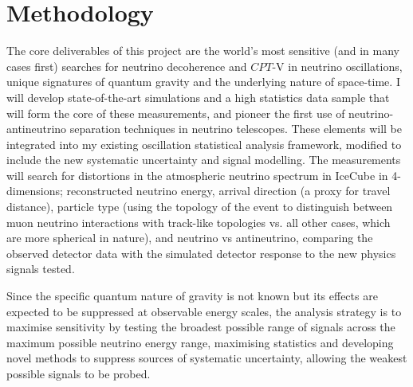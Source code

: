 \documentclass[a4paper,11pt]{article}
\newcounter{bar}
\begin{document}



\section{Methodology}
\vspace{0.1 cm}



The core deliverables of this project are the world's most sensitive (and in many cases first) searches for neutrino decoherence and $CPT$-V in neutrino oscillations, unique signatures of quantum gravity and the underlying nature of space-time. I will develop state-of-the-art simulations and a high statistics data sample that will form the core of these measurements, and pioneer the first use of neutrino-antineutrino separation techniques in neutrino telescopes. These elements will be integrated into my existing oscillation statistical analysis framework, modified to include the new systematic uncertainty and signal modelling. The measurements will search for distortions in the atmospheric neutrino spectrum in IceCube in 4-dimensions; reconstructed neutrino energy, arrival direction (a proxy for travel distance), particle type (using the topology of the event to distinguish between muon neutrino interactions with track-like topologies vs. all other cases, which are more spherical in nature), and neutrino vs antineutrino, comparing the observed detector data with the simulated detector response to the new physics signals tested. 

Since the specific quantum nature of gravity is not known but its effects are expected to be suppressed at observable energy scales, the analysis strategy is to maximise sensitivity by testing the broadest possible range of signals across the maximum possible neutrino energy range, maximising statistics and developing novel methods to suppress sources of systematic uncertainty, allowing the weakest possible signals to be probed.  \\
\end{document}

